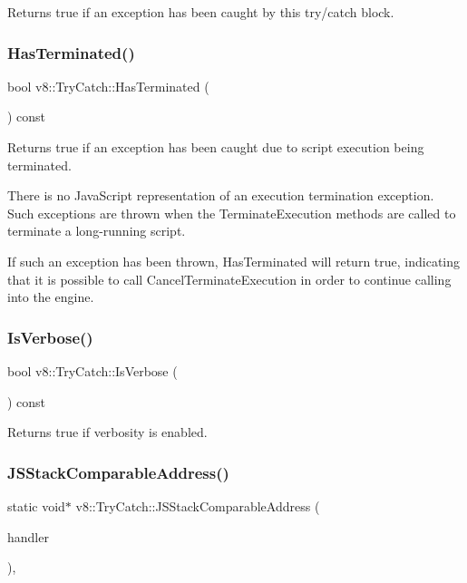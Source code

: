 Returns true if an exception has been caught by this try/catch block. \mbox{\label{classv8_1_1TryCatch_a3175391e782afc092495616b4d35b91b}} 
\subsubsection{\texorpdfstring{Has\+Terminated()}{HasTerminated()}}
{\footnotesize\ttfamily bool v8\+::\+Try\+Catch\+::\+Has\+Terminated (\begin{DoxyParamCaption}{ }\end{DoxyParamCaption}) const}

Returns true if an exception has been caught due to script execution being terminated.

There is no Java\+Script representation of an execution termination exception. Such exceptions are thrown when the Terminate\+Execution methods are called to terminate a long-\/running script.

If such an exception has been thrown, Has\+Terminated will return true, indicating that it is possible to call Cancel\+Terminate\+Execution in order to continue calling into the engine. \mbox{\label{classv8_1_1TryCatch_aa4e77abd0d6790700442153cb036517f}} 
\subsubsection{\texorpdfstring{Is\+Verbose()}{IsVerbose()}}
{\footnotesize\ttfamily bool v8\+::\+Try\+Catch\+::\+Is\+Verbose (\begin{DoxyParamCaption}{ }\end{DoxyParamCaption}) const}

Returns true if verbosity is enabled. \mbox{\label{classv8_1_1TryCatch_a164f5def2f8fa5deb6bcf06fb50fbff2}} 
\subsubsection{\texorpdfstring{J\+S\+Stack\+Comparable\+Address()}{JSStackComparableAddress()}}
{\footnotesize\ttfamily static void$\ast$ v8\+::\+Try\+Catch\+::\+J\+S\+Stack\+Comparable\+Address (\begin{DoxyParamCaption}\item[{\mbox{\hyperlink{classv8_1_1TryCatch}{Try\+Catch}} $\ast$}]{handler }\end{DoxyParamCaption})\hspace{0.3cm}{\ttfamily [inline]}, {\ttfamily [static]}}

